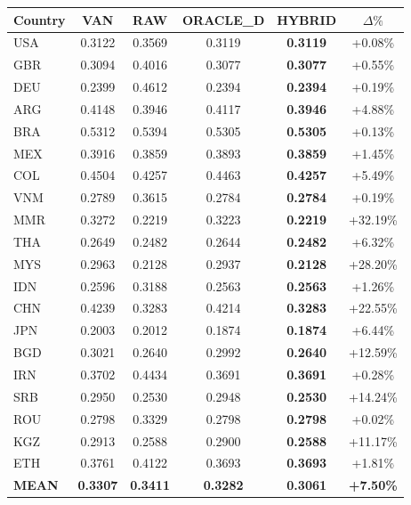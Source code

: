 \begin{tabular}{lccccc}
\toprule
Country & VAN & RAW & ORACLE\_D & HYBRID & $\Delta\%$ \\
\midrule
USA & 0.3122 & 0.3569 & 0.3119 & \textbf{0.3119} & +0.08\% \\
GBR & 0.3094 & 0.4016 & 0.3077 & \textbf{0.3077} & +0.55\% \\
DEU & 0.2399 & 0.4612 & 0.2394 & \textbf{0.2394} & +0.19\% \\
ARG & 0.4148 & 0.3946 & 0.4117 & \textbf{0.3946} & +4.88\% \\
BRA & 0.5312 & 0.5394 & 0.5305 & \textbf{0.5305} & +0.13\% \\
MEX & 0.3916 & 0.3859 & 0.3893 & \textbf{0.3859} & +1.45\% \\
COL & 0.4504 & 0.4257 & 0.4463 & \textbf{0.4257} & +5.49\% \\
VNM & 0.2789 & 0.3615 & 0.2784 & \textbf{0.2784} & +0.19\% \\
MMR & 0.3272 & 0.2219 & 0.3223 & \textbf{0.2219} & +32.19\% \\
THA & 0.2649 & 0.2482 & 0.2644 & \textbf{0.2482} & +6.32\% \\
MYS & 0.2963 & 0.2128 & 0.2937 & \textbf{0.2128} & +28.20\% \\
IDN & 0.2596 & 0.3188 & 0.2563 & \textbf{0.2563} & +1.26\% \\
CHN & 0.4239 & 0.3283 & 0.4214 & \textbf{0.3283} & +22.55\% \\
JPN & 0.2003 & 0.2012 & 0.1874 & \textbf{0.1874} & +6.44\% \\
BGD & 0.3021 & 0.2640 & 0.2992 & \textbf{0.2640} & +12.59\% \\
IRN & 0.3702 & 0.4434 & 0.3691 & \textbf{0.3691} & +0.28\% \\
SRB & 0.2950 & 0.2530 & 0.2948 & \textbf{0.2530} & +14.24\% \\
ROU & 0.2798 & 0.3329 & 0.2798 & \textbf{0.2798} & +0.02\% \\
KGZ & 0.2913 & 0.2588 & 0.2900 & \textbf{0.2588} & +11.17\% \\
ETH & 0.3761 & 0.4122 & 0.3693 & \textbf{0.3693} & +1.81\% \\
\midrule
\textbf{MEAN} & \textbf{0.3307} & \textbf{0.3411} & \textbf{0.3282} & \textbf{0.3061} & \textbf{+7.50\%} \\
\bottomrule
\end{tabular}
